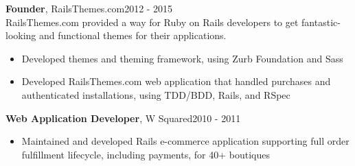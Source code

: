 \documentclass[line, margin, 10pt]{res}
\begin{document}
\begin{resume}
{\bf Founder}, RailsThemes.com\hfill 2012 - 2015\\
RailsThemes.com provided a way for Ruby on Rails developers to get fantastic-looking and functional themes for their applications.
\begin{itemize} \itemsep -2pt  %
    \item Developed themes and theming framework, using Zurb Foundation and Sass
    \item Developed RailsThemes.com web application that handled purchases and authenticated installations, using TDD/BDD, Rails, and RSpec
\end{itemize}

{\bf Web Application Developer}, W Squared\hfill 2010 - 2011
\begin{itemize} \itemsep -2pt
\item Maintained and developed Rails e-commerce application supporting full order fulfillment lifecycle, including payments, for 40+ boutiques
\end{itemize}





\end{resume}
\end{document}
